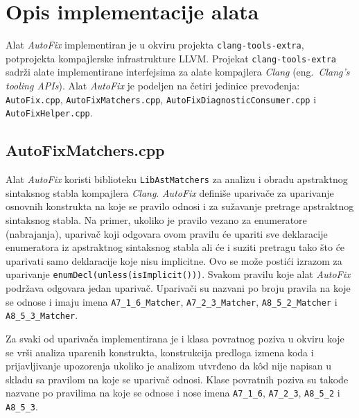 \documentclass[12pt,oneside]{memoir}
\begin{document}
\section{Opis implementacije alata}

Alat \textit{AutoFix} implementiran je u okviru projekta \texttt{clang-tools-extra}, potprojekta kompajlerske infrastrukture LLVM. Projekat \texttt{clang-tools-extra} sadr\v{z}i alate implementirane interfejsima za alate kompajlera \textit{Clang} (eng.~\textit{Clang’s tooling APIs}).
Alat \textit{AutoFix} je podeljen na \v{c}etiri jedinice prevođenja: \texttt{AutoFix.cpp}, \texttt{AutoFix\-Matchers.cpp}, \texttt{AutoFixDiagnosticConsumer.cpp} i \texttt{AutoFixHelper.cpp}.

\subsection{AutoFixMatchers.cpp}
Alat \textit{AutoFix} koristi biblioteku \texttt{LibAstMatchers} za analizu i obradu apstraktnog sintaksnog stabla kompajlera \textit{Clang}. 
\textit{AutoFix} defini\v{s}e upariva\v{c}e za uparivanje osnovnih konstrukta na koje se pravilo odnosi i za su\v{z}avanje pretrage apstraktnog sintaksnog stabla. Na primer, ukoliko je pravilo vezano za enumeratore (nabrajanja), upariva\v{c} koji odgovara ovom pravilu \'{c}e upariti sve deklaracije enumeratora iz apstraktnog sintaksnog stabla ali \'{c}e i suziti pretragu tako \v{s}to \'{c}e uparivati samo deklaracije koje nisu implicitne. Ovo se mo\v{z}e posti\'{c}i izrazom za uparivanje \texttt{enumDecl(unless(isImplicit()))}. Svakom pravilu koje alat \textit{AutoFix} podr\v{z}ava odgovara jedan upariva\v{c}. Upariva\v{c}i su nazvani po broju pravila na koje se odnose i imaju imena
\texttt{A7\_1\_6\_Matcher}, \texttt{A7\_2\_3\_Matcher}, \texttt{A8\_5\_2\_Matcher} i \texttt{A8\_5\_3\_Matcher}.
\par
 Za svaki od upariva\v{c}a implementirana je i klasa povratnog poziva u okviru koje se vr\v{s}i analiza uparenih konstrukta, konstrukcija predloga izmena koda i prijavljivanje upozorenja ukoliko je analizom utvrđeno da k\^{o}d nije napisan u skladu sa pravilom na koje se upariva\v{c} odnosi. Klase
 povratnih poziva su takođe nazvane po pravilima na koje se odnose i nose imena \texttt{A7\_1\_6}, \texttt{A7\_2\_3}, \texttt{A8\_5\_2} i \texttt{A8\_5\_3}.
\end{document}
